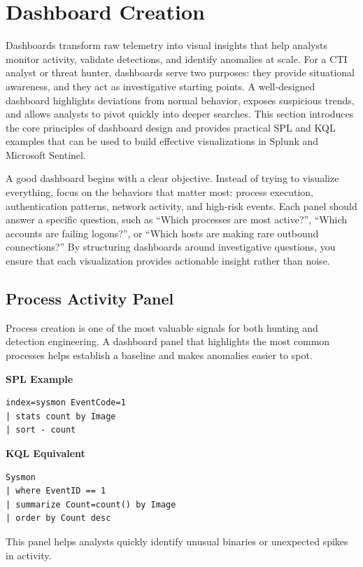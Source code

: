 \section{Dashboard Creation}

Dashboards transform raw telemetry into visual insights that help analysts monitor activity, validate detections, and 
identify anomalies at scale. For a CTI analyst or threat hunter, dashboards serve two purposes: they provide situational 
awareness, and they act as investigative starting points. A well‑designed dashboard highlights deviations from normal 
behavior, exposes suspicious trends, and allows analysts to pivot quickly into deeper searches. This section introduces 
the core principles of dashboard design and provides practical SPL and KQL examples that can be used to build effective 
visualizations in Splunk and Microsoft Sentinel.

A good dashboard begins with a clear objective. Instead of trying to visualize everything, focus on the behaviors that 
matter most: process execution, authentication patterns, network activity, and high‑risk events. Each panel should answer 
a specific question, such as “Which processes are most active?”, “Which accounts are failing logons?”, or “Which hosts 
are making rare outbound connections?” By structuring dashboards around investigative questions, you ensure that each 
visualization provides actionable insight rather than noise.

\subsection*{Process Activity Panel}

Process creation is one of the most valuable signals for both hunting and detection engineering. A dashboard panel that 
highlights the most common processes helps establish a baseline and makes anomalies easier to spot.

\textbf{SPL Example}
\begin{lstlisting}
index=sysmon EventCode=1
| stats count by Image
| sort - count
\end{lstlisting}

\textbf{KQL Equivalent}
\begin{lstlisting}
Sysmon
| where EventID == 1
| summarize Count=count() by Image
| order by Count desc
\end{lstlisting}

This panel helps analysts quickly identify unusual binaries or unexpected spikes in activity.

